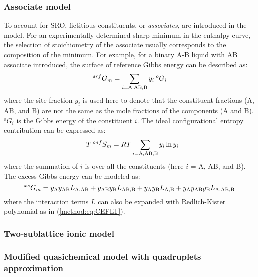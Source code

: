 \subsubsection{Associate model} \label{method:sssec:assm}
To account for SRO, fictitious constituents, or \textit{associates}, are introduced in the model. For an experimentally determined sharp minimum in the enthalpy curve, the selection of stoichiometry of the associate usually corresponds to the composition of the minimum. For example, for a binary A-B liquid with AB associate introduced, the surface of reference Gibbs energy can be described as:
\begin{equation} \label{method:eq:assmGsrf}
    ^{srf}G_m=\sum_{i={\rm A,AB,B}} y_i\:^{o}G_{i}
\end{equation}
where the site fraction $y_i$ is used here to denote that the constituent fractions (A, AB, and B) are not the same as the mole fractions of the components (A and B). $^{o}G_{i}$ is the Gibbs energy of the constituent $i$. The ideal configurational entropy contribution can be expressed as:
\begin{equation} \label{method:eq:assmScnf}
    -T\:^{cnf}S_m=RT\sum_{i={\rm A,AB,B}}y_i\ln y_i
\end{equation}
where the summation of $i$ is over all the constituents (here $i$ = A, AB, and B). The excess Gibbs energy can be modeled as:
\begin{equation} \label{method:eq:assmGex}
    ^{xs}G_m=y_{\rm A}y_{\rm AB}L_{\rm A,AB}+y_{\rm AB}y_{\rm B}L_{\rm AB,B}+y_{\rm A}y_{\rm B}L_{\rm A,B}+y_{\rm A}y_{\rm AB}y_{\rm B}L_{\rm A,AB,B}
\end{equation}
where the interaction terms $L$ can also be expanded with Redlich-Kister polynomial \cite{redlich1948algebraic} as in (\ref{method:eq:CEFLT}).

\subsubsection{Two-sublattice ionic model} \label{method:sssec:ionic}

\subsubsection{Modified quasichemical model with quadruplets approximation} \label{method:ssec:mqmqa}

